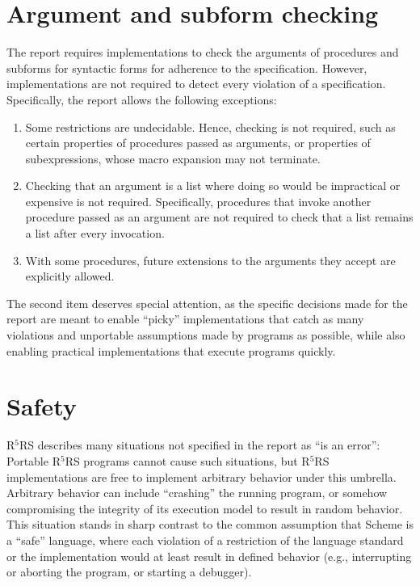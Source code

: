 \documentclass[twoside,twocolumn]{algol60}
\newcommand{\rn}[1]{R$^{#1}$RS}
\begin{document}
\section{Argument and subform checking}
\label{argumentchecking}

The report requires implementations to check the arguments of
procedures and subforms for syntactic forms for adherence to the
specification.  However, implementations are not required to detect
every violation of a specification.  Specifically, the report allows
the following exceptions:
%
\begin{enumerate}
\item Some restrictions are undecidable.  Hence, checking is not
  required, such as certain properties of procedures passed as
  arguments, or properties of subexpressions, whose macro expansion
  may not terminate.
\item Checking that an argument is a list where doing so would be
  impractical or expensive is not required.  Specifically, procedures that
  invoke another procedure passed as an argument are not required to
  check that a list remains a list after every invocation.
\item With some procedures, future extensions to the arguments they
  accept are explicitly allowed.
\end{enumerate}
%
The second item deserves special attention, as the specific decisions
made for the report are meant to enable ``picky'' implementations that
catch as many violations and unportable assumptions made by programs
as possible, while also enabling practical
implementations that execute programs quickly.

\section{Safety}

\rn{5} describes many situations not specified in the report as ``is
an error'': Portable \rn{5} programs cannot cause such situations, but
\rn{5} implementations are free to implement arbitrary behavior under this
umbrella.  Arbitrary behavior can include ``crashing'' the running program, or
somehow compromising the integrity of its execution model to result
in random behavior.  This situation stands in sharp contrast to the common assumption
that Scheme is a ``safe'' language, where each
violation of a restriction of the language standard or the
implementation would at least result in defined behavior (e.g.,
interrupting or aborting the program, or starting a debugger).
\end{document}
